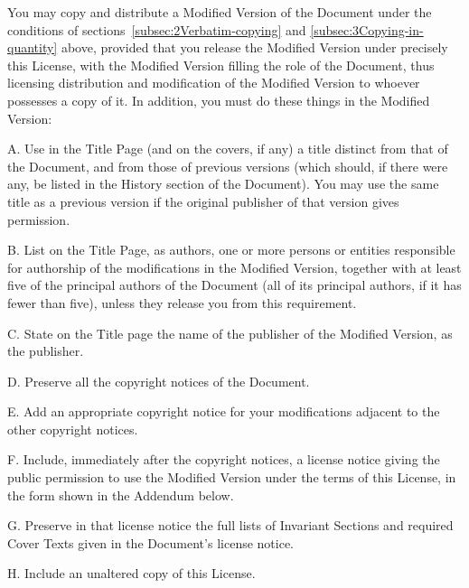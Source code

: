 {\tiny{}You may copy and distribute a Modified Version of the Document
under the conditions of sections~\ref{subsec:2Verbatim-copying}
and \ref{subsec:3Copying-in-quantity} above, provided that you release
the Modified Version under precisely this License, with the Modified
Version filling the role of the Document, thus licensing distribution
and modification of the Modified Version to whoever possesses a copy
of it. In addition, you must do these things in the Modified Version:}{\tiny\par}

{\tiny{}A. Use in the Title Page (and on the covers, if any) a title
distinct from that of the Document, and from those of previous versions
(which should, if there were any, be listed in the History section
of the Document). You may use the same title as a previous version
if the original publisher of that version gives permission.}{\tiny\par}

{\tiny{}B. List on the Title Page, as authors, one or more persons
or entities responsible for authorship of the modifications in the
Modified Version, together with at least five of the principal authors
of the Document (all of its principal authors, if it has fewer than
five), unless they release you from this requirement.}{\tiny\par}

{\tiny{}C. State on the Title page the name of the publisher of the
Modified Version, as the publisher.}{\tiny\par}

{\tiny{}D. Preserve all the copyright notices of the Document.}{\tiny\par}

{\tiny{}E. Add an appropriate copyright notice for your modifications
adjacent to the other copyright notices.}{\tiny\par}

{\tiny{}F. Include, immediately after the copyright notices, a license
notice giving the public permission to use the Modified Version under
the terms of this License, in the form shown in the Addendum below.}{\tiny\par}

{\tiny{}G. Preserve in that license notice the full lists of Invariant
Sections and required Cover Texts given in the Document\textsf{'}s license
notice.}{\tiny\par}

{\tiny{}H. Include an unaltered copy of this License.}{\tiny\par}

